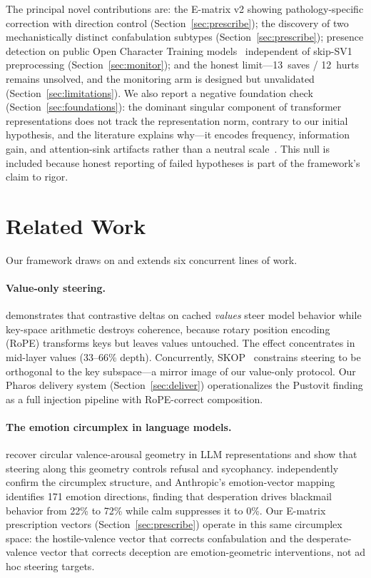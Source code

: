 \documentclass[11pt,a4paper]{article}
\begin{document}
The principal novel contributions are: the E-matrix v2 showing pathology-specific
correction with direction control (Section~\ref{sec:prescribe}); the discovery
of two mechanistically distinct confabulation subtypes
(Section~\ref{sec:prescribe}); presence detection on public Open Character
Training models~\citep{maiya2025oct} independent of skip-SV1 preprocessing
(Section~\ref{sec:monitor}); and the honest limit---13~saves / 12~hurts remains
unsolved, and the monitoring arm is designed but unvalidated
(Section~\ref{sec:limitations}). We also report a negative foundation check
(Section~\ref{sec:foundations}): the dominant singular component of
transformer representations does not track the representation norm, contrary
to our initial hypothesis, and the literature explains why---it encodes
frequency, information gain, and attention-sink artifacts rather than a neutral
scale~\citep{mu2018allbutthetop, sun2024massive}. This null is included because
honest reporting of failed hypotheses is part of the framework's claim to rigor.

\section{Related Work}
\label{sec:related}

Our framework draws on and extends six concurrent lines of work.

\paragraph{Value-only steering.}
\citet{pustovit2026knowledge} demonstrates that contrastive deltas on cached
\emph{values} steer model behavior while key-space arithmetic destroys coherence,
because rotary position encoding (RoPE) transforms keys but leaves values
untouched. The effect concentrates in mid-layer values (33--66\% depth).
Concurrently, SKOP~\citep{skop2026} constrains steering to be orthogonal to
the key subspace---a mirror image of our value-only protocol. Our Pharos
delivery system (Section~\ref{sec:deliver}) operationalizes the Pustovit
finding as a full injection pipeline with RoPE-correct composition.

\paragraph{The emotion circumplex in language models.}
\citet{sun2026circumplex} recover circular valence-arousal geometry in LLM
representations and show that steering along this geometry controls refusal and
sycophancy. \citet{choi2026circumplex} independently confirm the circumplex
structure, and Anthropic's emotion-vector mapping~\citep{anthropic2026emotion}
identifies 171 emotion directions, finding that desperation drives blackmail
behavior from 22\% to 72\% while calm suppresses it to 0\%. Our E-matrix
prescription vectors (Section~\ref{sec:prescribe}) operate in this same
circumplex space: the hostile-valence vector that corrects confabulation and
the desperate-valence vector that corrects deception are emotion-geometric
interventions, not ad hoc steering targets.
\end{document}
